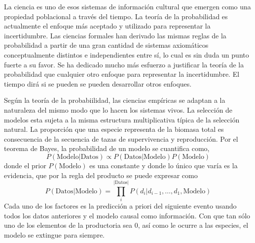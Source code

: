 \documentclass[a4paper,10pt]{book}
\begin{document}

La ciencia es uno de esos sistemas de información cultural que emergen como una propiedad poblacional a través del tiempo.
%
La teoría de la probabilidad es actualmente el enfoque más aceptado y utilizado para representar la incertidumbre.
%
Las ciencias formales han derivado las mismas reglas de la probabilidad a partir de una gran cantidad de sistemas axiomáticos conceptualmente distintos e independientes entre sí, lo cual es sin duda un punto fuerte a su favor.
%
Se ha dedicado mucho más esfuerzo a justificar la teoría de la probabilidad que cualquier otro enfoque para representar la incertidumbre.
%
El tiempo dirá si se pueden se pueden desarrollar otros enfoques.


Según la teoría de la probabiilidad, las ciencias empíricas se adaptan a la naturaleza del mismo modo que lo hacen los sistemas vivos.
%
La selección de modelos esta sujeta a la misma estructura multiplicativa típica de la selección natural.
%
La proporción que una especie representa de la biomasa total es consecuencia de la secuencia de tazas de supervivencia y reproducción.
%
Por el teorema de Bayes, la probabilidad de un modelo se cuantifica como,
%
\begin{equation}
 P(\text{Modelo}|\text{Datos}) \propto P(\text{Datos}|\text{Modelo})P(\text{Modelo})
\end{equation}
%
donde el prior $P(\text{Modelo})$ es una constante y donde lo único que varía es la evidencia, que por la regla del producto se puede expresar como
%
\begin{equation}\label{eq:evidencia_teorica}
  P(\text{Datos}|\text{Modelo}) = \prod_i^{|\text{Datos}|} P(d_i|d_{i-1}, \dots, d_1, \text{Modelo})
\end{equation}
%
Cada uno de los factores es la predicción a priori del siguiente evento usando todos los datos anteriores y el modelo causal como información.
%
Con que tan sólo uno de los elementos de la productoria sea 0, así como le ocurre a las especies, el modelo se extingue para siempre.

\end{document}
